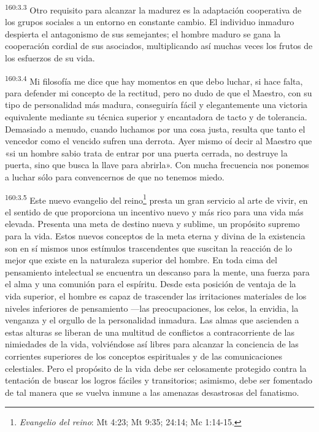 \par
\textsuperscript{160:3.3} Otro requisito para alcanzar la madurez es la adaptación cooperativa de los grupos sociales a un entorno en constante cambio. El individuo inmaduro despierta el antagonismo de sus semejantes; el hombre maduro se gana la cooperación cordial de sus asociados, multiplicando así muchas veces los frutos de los esfuerzos de su vida.

\par
\textsuperscript{160:3.4} Mi filosofía me dice que hay momentos en que debo luchar, si hace falta, para defender mi concepto de la rectitud, pero no dudo de que el Maestro, con su tipo de personalidad más madura, conseguiría fácil y elegantemente una victoria equivalente mediante su técnica superior y encantadora de tacto y de tolerancia. Demasiado a menudo, cuando luchamos por una cosa justa, resulta que tanto el vencedor como el vencido sufren una derrota. Ayer mismo oí decir al Maestro que «si un hombre sabio trata de entrar por una puerta cerrada, no destruye la puerta, sino que busca la llave para abrirla». Con mucha frecuencia nos ponemos a luchar sólo para convencernos de que no tenemos miedo.

\par
\textsuperscript{160:3.5} Este nuevo evangelio del reino\footnote{\textit{Evangelio del reino}: Mt 4:23; Mt 9:35; 24:14; Mc 1:14-15.} presta un gran servicio al arte de vivir, en el sentido de que proporciona un incentivo nuevo y más rico para una vida más elevada. Presenta una meta de destino nueva y sublime, un propósito supremo para la vida. Estos nuevos conceptos de la meta eterna y divina de la existencia son en sí mismos unos estímulos trascendentes que suscitan la reacción de lo mejor que existe en la naturaleza superior del hombre. En toda cima del pensamiento intelectual se encuentra un descanso para la mente, una fuerza para el alma y una comunión para el espíritu. Desde esta posición de ventaja de la vida superior, el hombre es capaz de trascender las irritaciones materiales de los niveles inferiores de pensamiento ---las preocupaciones, los celos, la envidia, la venganza y el orgullo de la personalidad inmadura. Las almas que ascienden a estas alturas se liberan de una multitud de conflictos a contracorriente de las nimiedades de la vida, volviéndose así libres para alcanzar la conciencia de las corrientes superiores de los conceptos espirituales y de las comunicaciones celestiales. Pero el propósito de la vida debe ser celosamente protegido contra la tentación de buscar los logros fáciles y transitorios; asimismo, debe ser fomentado de tal manera que se vuelva inmune a las amenazas desastrosas del fanatismo.

